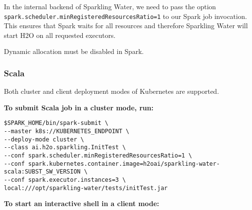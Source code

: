In the internal backend of Sparkling Water, we need to pass the option \texttt{spark.scheduler.minRegisteredResourcesRatio=1}
to our Spark job invocation. This ensures that Spark waits for all resources and therefore Sparkling Water will
start H2O on all requested executors.

Dynamic allocation must be disabled in Spark.

\subsubsection{Scala}

Both cluster and client deployment modes of Kubernetes are supported.

\textbf{To submit Scala job in a cluster mode, run:}

\begin{lstlisting}[style=Bash]
$SPARK_HOME/bin/spark-submit \
--master k8s://KUBERNETES_ENDPOINT \
--deploy-mode cluster \
--class ai.h2o.sparkling.InitTest \
--conf spark.scheduler.minRegisteredResourcesRatio=1 \
--conf spark.kubernetes.container.image=h2oai/sparkling-water-scala:SUBST_SW_VERSION \
--conf spark.executor.instances=3 \
local:///opt/sparkling-water/tests/initTest.jar
\end{lstlisting}

\textbf{To start an interactive shell in a client mode:}

